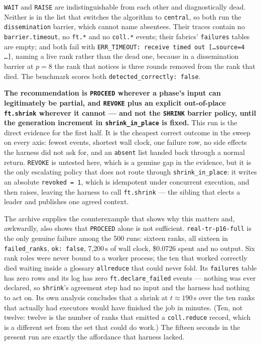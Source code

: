 \documentclass[11pt]{article}
\begin{document}
\texttt{WAIT} and \texttt{RAISE} are indistinguishable from each other and diagnostically
dead. Neither is in the list that switches the algorithm to \texttt{central}, so both run
the \texttt{dissemination} barrier, which cannot name absentees. Their traces contain no
\texttt{barrier.timeout}, no \texttt{ft.*} and no \texttt{coll.*} events; their fabrics'
\texttt{failures} tables are empty; and both fail with
\texttt{ERR\_TIMEOUT: receive timed out [\ldots source=4 \ldots]}, naming a live rank
rather than the dead one, because in a dissemination barrier at $p=8$ the rank that
notices is three rounds removed from the rank that died. The benchmark scores both
\texttt{detected\_correctly: false}.

\textbf{The recommendation is \texttt{PROCEED} wherever a phase's input can legitimately
be partial, and \texttt{REVOKE} plus an explicit out-of-place \texttt{ft.shrink} wherever
it cannot --- and not the \texttt{SHRINK} barrier policy, until the generation increment
in \texttt{shrink\_in\_place} is fixed.} This run is the direct evidence for the first
half. It is the cheapest correct outcome in the sweep on every axis: fewest events,
shortest wall clock, one failure row, no side effects the harness did not ask for, and an
\texttt{absent} list handed back through a normal return. \texttt{REVOKE} is untested
here, which is a genuine gap in the evidence, but it is the only escalating policy that
does not route through \texttt{shrink\_in\_place}: it writes an absolute
\texttt{revoked = 1}, which is idempotent under concurrent execution, and then raises,
leaving the harness to call \texttt{ft.shrink} --- the sibling that elects a leader and
publishes one agreed context.

The archive supplies the counterexample that shows why this matters and, awkwardly, also
shows that \texttt{PROCEED} alone is not sufficient. \texttt{real-tr-p16-full} is the only
genuine failure among the 500 runs: sixteen ranks, all sixteen in \texttt{failed\_ranks},
\texttt{ok: false}, 7{,}200\,s of wall clock, \$0.0726 spent and no output. Six rank roles
were never bound to a worker process; the ten that worked correctly died waiting inside a
glossary \texttt{allreduce} that could never fold. Its \texttt{failures} table has zero
rows and its log has zero \texttt{ft.declare\_failed} events --- nothing was ever declared,
so \texttt{shrink}'s agreement step had no input and the harness had nothing to act on. Its
own analysis concludes that a shrink at $t\approx190$\,s over the ten ranks that actually
had executors would have finished the job in minutes. (Ten, not twelve: twelve is the
number of ranks that emitted a \texttt{coll.reduce} record, which is a different set from
the set that could do work.) The fifteen seconds in the present run are exactly the
affordance that harness lacked.
\end{document}
